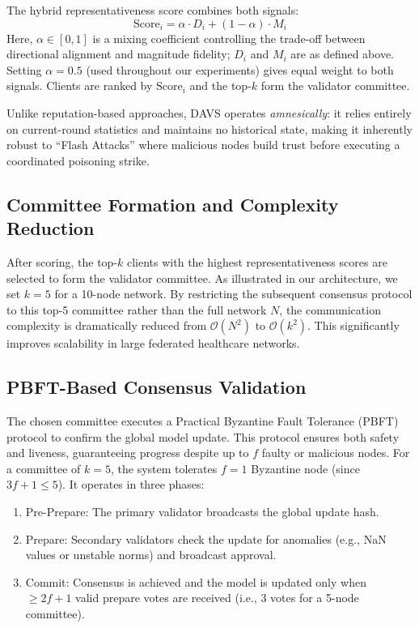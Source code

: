 \documentclass[conference]{IEEEtran}
\begin{document}
The hybrid representativeness score combines both signals:
\begin{equation}
    \text{Score}_i = \alpha \cdot D_i + (1 - \alpha) \cdot M_i
\end{equation}
Here, $\alpha \in [0,1]$ is a mixing coefficient controlling the trade-off between directional alignment and magnitude fidelity; $D_i$ and $M_i$ are as defined above. Setting $\alpha = 0.5$ (used throughout our experiments) gives equal weight to both signals. Clients are ranked by $\text{Score}_i$ and the top-$k$ form the validator committee.

Unlike reputation-based approaches, DAVS operates \textit{amnesically}: it relies entirely on current-round statistics and maintains no historical state, making it inherently robust to ``Flash Attacks'' where malicious nodes build trust before executing a coordinated poisoning strike.

\subsection{Committee Formation and Complexity Reduction}
After scoring, the top-$k$ clients with the highest representativeness scores are selected to form the validator committee. As illustrated in our architecture, we set $k=5$ for a 10-node network. By restricting the subsequent consensus protocol to this top-5 committee rather than the full network $N$, the communication complexity is dramatically reduced from $\mathcal{O}(N^2)$ to $\mathcal{O}(k^2)$. This significantly improves scalability in large federated healthcare networks.

\subsection{PBFT-Based Consensus Validation}
The chosen committee executes a Practical Byzantine Fault Tolerance (PBFT) protocol to confirm the global model update. This protocol ensures both safety and liveness, guaranteeing progress despite up to $f$ faulty or malicious nodes. For a committee of $k=5$, the system tolerates $f=1$ Byzantine node (since $3f+1 \leq 5$). It operates in three phases:
\begin{enumerate}
    \item Pre-Prepare: The primary validator broadcasts the global update hash.
    \item Prepare: Secondary validators check the update for anomalies (e.g., NaN values or unstable norms) and broadcast approval.
    \item Commit: Consensus is achieved and the model is updated only when $\geq 2f+1$ valid prepare votes are received (i.e., 3 votes for a 5-node committee).
\end{enumerate}
\end{document}
